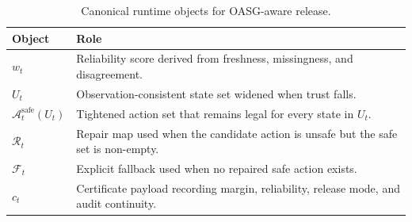 \begin{table}[t]
\centering
\small
\caption{Canonical runtime objects for OASG-aware release.}
\label{tab:prof-oasg-objects}
\begin{tabularx}{\columnwidth}{@{}p{}X@{}}
\toprule
\textbf{Object} & \textbf{Role} \\
\midrule
\(w_t\) & Reliability score derived from freshness, missingness, and disagreement. \\
\(U_t\) & Observation-consistent state set widened when trust falls. \\
\(\mathcal{A}^{\mathrm{safe}}_t(U_t)\) & Tightened action set that remains legal for every state in \(U_t\). \\
\(\mathcal{R}_t\) & Repair map used when the candidate action is unsafe but the safe set is non-empty. \\
\(\mathcal{F}_t\) & Explicit fallback used when no repaired safe action exists. \\
\(c_t\) & Certificate payload recording margin, reliability, release mode, and audit continuity. \\
\bottomrule
\end{tabularx}
\end{table}
